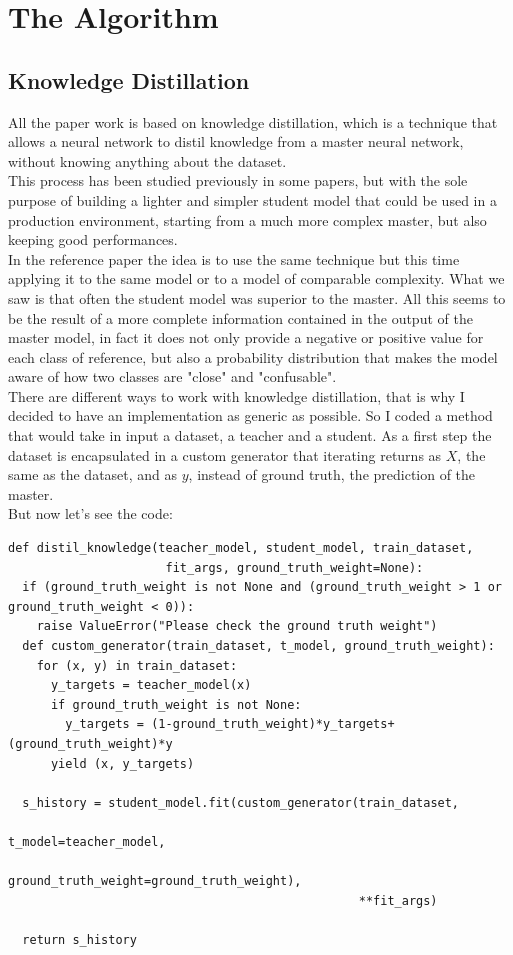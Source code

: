 \section{The Algorithm}
\subsection{Knowledge Distillation}
All the paper work is based on knowledge distillation, which is a technique that allows a neural network to distil knowledge from a master neural network, without knowing anything about the dataset.\\ 
This process has been studied previously in some papers\cite{kd}\cite{fokd}\cite{tkd}, but with the sole purpose of building a lighter and simpler student model that could be used in a production environment, starting from a much more complex master, but also keeping good performances.\\
In the reference paper the idea is to use the same technique but this time applying it to the same model or to a model of comparable complexity. What we saw is that often the student model was superior to the master. All this seems to be the result of a more complete information contained in the output of the master model, in fact it does not only provide a negative or positive value for each class of reference, but also a probability distribution that makes the model aware of how two classes are "close" and "confusable".\\
There are different ways to work with knowledge distillation, that is why I decided to have an implementation as generic as possible. So I coded a method that would take in input a dataset, a teacher and a student. As a first step the dataset is encapsulated in a custom generator that iterating returns as $X$, the same as the dataset, and as $y$, instead of ground truth, the prediction of the master.\\
But now let's see the code:
\lstset{language=Python}
\lstset{frame=lines}
\lstset{basicstyle=\footnotesize}
\begin{lstlisting}
def distil_knowledge(teacher_model, student_model, train_dataset, 
                      fit_args, ground_truth_weight=None):
  if (ground_truth_weight is not None and (ground_truth_weight > 1 or ground_truth_weight < 0)):
    raise ValueError("Please check the ground truth weight")
  def custom_generator(train_dataset, t_model, ground_truth_weight):
    for (x, y) in train_dataset:
      y_targets = teacher_model(x)
      if ground_truth_weight is not None:
        y_targets = (1-ground_truth_weight)*y_targets+(ground_truth_weight)*y
      yield (x, y_targets)

  s_history = student_model.fit(custom_generator(train_dataset, 
                                                 t_model=teacher_model,
                                                 ground_truth_weight=ground_truth_weight),             
                                                 **fit_args)

  return s_history
\end{lstlisting}

